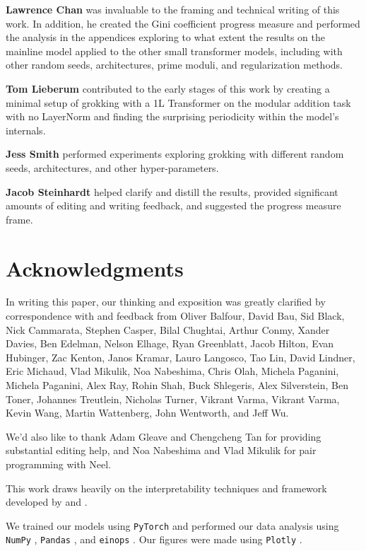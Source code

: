 \documentclass{article} %
\begin{document}
\textbf{Lawrence Chan} was invaluable to the framing and technical writing of this work. In addition, he created the Gini coefficient progress measure and performed the analysis in the appendices exploring to what extent the results on the mainline model applied to the other small transformer models, including with other random seeds, architectures, prime moduli, and regularization methods.

\textbf{Tom Lieberum} contributed to the early stages of this work by creating a minimal setup of grokking with a 1L Transformer on the modular addition task with no LayerNorm and finding the surprising periodicity within the model's internals.

\textbf{Jess Smith} performed experiments exploring grokking with different random seeds, architectures, and other hyper-parameters.

\textbf{Jacob Steinhardt} helped clarify and distill the results, provided significant amounts of editing and writing feedback, and suggested the progress measure frame.

\section*{Acknowledgments}
In writing this paper, our thinking and exposition was greatly clarified by correspondence with and feedback from  Oliver Balfour, David Bau, Sid Black, Nick Cammarata, Stephen Casper, Bilal Chughtai, Arthur Conmy, Xander Davies, Ben Edelman, Nelson Elhage, Ryan Greenblatt, Jacob Hilton, Evan Hubinger, Zac Kenton, Janos Kramar, Lauro Langosco, Tao Lin, David Lindner, Eric Michaud, Vlad Mikulik, Noa Nabeshima, Chris Olah, Michela Paganini, Michela Paganini, Alex Ray, Rohin Shah, Buck Shlegeris, Alex Silverstein, Ben Toner, Johannes Treutlein, Nicholas Turner, Vikrant Varma, Vikrant Varma, Kevin Wang, Martin Wattenberg, John Wentworth, and Jeff Wu. 

We'd also like to thank Adam Gleave and Chengcheng Tan for providing substantial editing help, and Noa Nabeshima and Vlad Mikulik for pair programming with Neel.

This work draws heavily on the interpretability techniques and framework developed by \cite{elhage2021mathematical} and \cite{olsson2022context}. 

We trained our models using \texttt{PyTorch} \citep{paszke2019pytorch} and performed our data analysis using \texttt{NumPy} \citep{harris2020array}, \texttt{Pandas} \citep{mckinney-proc-scipy-2010}, and \texttt{einops} \citep{rogozhnikov2022einops}. Our figures were made using \texttt{Plotly} \citep{plotly}.
\end{document}
